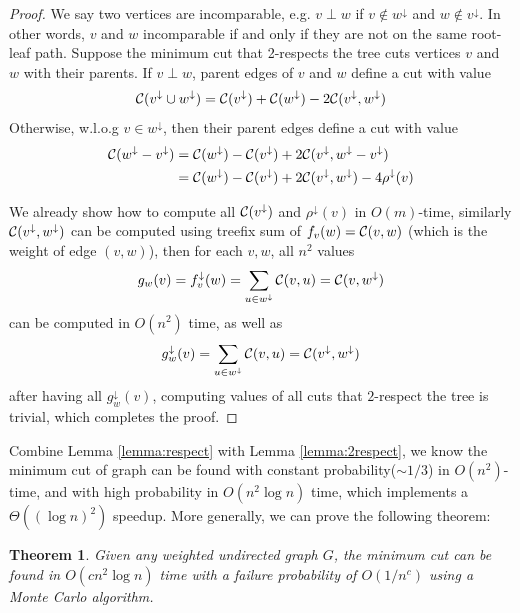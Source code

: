 \documentclass[11pt]{article}
\newcommand{\descendants}[1]{#1^\downarrow}
\newcommand{\cutval}[1]{{\cal C}(#1)}
\newcommand{\crossweight}[2]{{\cal C}(#1,#2)}
\theoremstyle{plain}
\newtheorem{theorem}{Theorem}[section]
\begin{document}
\begin{proof}
    We say two vertices are incomparable, e.g. $v\perp w$ if $v \notin \descendants{w}$ and $w \notin \descendants{v}$.  In other words, $v$ and $w$ incomparable if and only if they are not on the same root-leaf path. Suppose the minimum cut that 2-respects the tree cuts vertices $v$ and $w$ with their parents. If $v\perp w$, parent edges of $v$ and $w$ define a cut with value
    \begin{align*}
        \cutval{\descendants{v}\cup\descendants{w}} =\cutval{\descendants{v}}+\cutval{\descendants{w}} -2\crossweight{\descendants{v}}{\descendants{w}} 
    \end{align*}
    Otherwise, w.l.o.g $v \in \descendants{w}$, then their parent edges define a cut with value
    \begin{align*}
        \cutval{\descendants{w}-\descendants{v}}&=\cutval{\descendants{w}}-\cutval{\descendants{v}}+2\crossweight{\descendants{v}}{\descendants{w}-\descendants{v}}\\
        &=\cutval{\descendants{w}}-\cutval{\descendants{v}}+2\crossweight{\descendants{v}}{\descendants{w}}-4\descendants{\rho}(v)
    \end{align*}
    
    We already show how to compute all $\cutval{\descendants{v}}$ and $\descendants{\rho}(v)$ in $O(m)$-time, similarly $\crossweight{\descendants{v}}{\descendants{w}}$ can be computed using treefix sum of $f_v(w)=\crossweight{v}{w}$ (which is the weight of edge $(v,w)$), then for each $v,w$, all $n^2$ values
    \begin{align*}
        g_w(v)=\descendants{f_v}(w)=\sum_{u\in\descendants{w}}\crossweight{v}{u}=\crossweight{v}{\descendants{w}}
    \end{align*}
    can be computed in $O(n^2)$ time, as well as
    \begin{align*}
        \descendants{g_w}(v)=\sum_{u\in\descendants{w}}\crossweight{v}{u}=\crossweight{\descendants{v}}{\descendants{w}}
    \end{align*}
    after having all $\descendants{g_w}(v)$, computing values of all cuts that $2$-respect the tree is trivial, which completes the proof.
\end{proof}

Combine Lemma \ref{lemma:respect} with Lemma \ref{lemma:2respect}, we know the minimum cut of graph can be found with constant probability($\sim 1/3$) in $O(n^2)$-time, and with high probability in $O(n^2\log n)$ time, which implements a $\Theta((\log n)^2)$ speedup. More generally, we can prove the following theorem:
\begin{theorem}
    Given any weighted undirected graph $G$, the minimum cut can be found in $O(cn^2\log n)$ time with a failure probability of $O(1/n^c)$ using a Monte Carlo algorithm.
\end{theorem}
\end{document}
